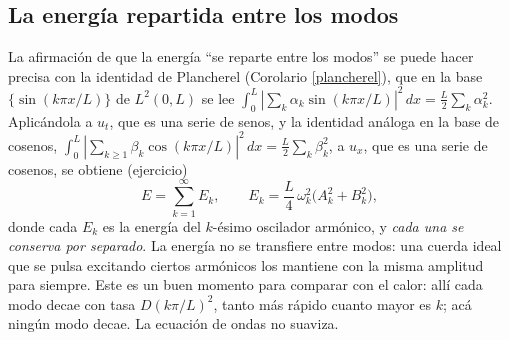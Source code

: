 \documentclass[12pt, a4paper]{amsbook}
\theoremstyle{remark}
\theoremstyle{definition}
\numberwithin{section}{chapter}
\numberwithin{subsection}{section}
\numberwithin{equation}{section}
\numberwithin{figure}{chapter}
\begin{document}
\subsection*{La energía repartida entre los modos}

La afirmación de que la energía ``se reparte entre los modos'' se puede hacer precisa con la identidad de Plancherel (Corolario \ref{plancherel}), que en la base $\{\sin(k\pi x/L)\}$ de $L^2(0,L)$ se lee $\int_0^L |\sum_k \alpha_k\sin(k\pi x/L)|^2\,dx = \frac{L}{2}\sum_k\alpha_k^2$. Aplicándola a $u_t$, que es una serie de senos, y la identidad análoga en la base de cosenos, $\int_0^L |\sum_{k\ge1} \beta_k\cos(k\pi x/L)|^2\,dx = \frac{L}{2}\sum_k\beta_k^2$, a $u_x$, que es una serie de cosenos, se obtiene (ejercicio)
\begin{equation}\label{eq:energia-modos}
E = \sum_{k=1}^\infty E_k,\qquad E_k = \frac{L}{4}\,\omega_k^2\bigl(A_k^2+B_k^2\bigr),
\end{equation}
donde cada $E_k$ es la energía del $k$-ésimo oscilador armónico, y \emph{cada una se conserva por separado}. La energía no se transfiere entre modos: una cuerda ideal que se pulsa excitando ciertos armónicos los mantiene con la misma amplitud para siempre. Este es un buen momento para comparar con el calor: allí cada modo decae con tasa $D(k\pi/L)^2$, tanto más rápido cuanto mayor es $k$; acá ningún modo decae. La ecuación de ondas no suaviza.
\end{document}

